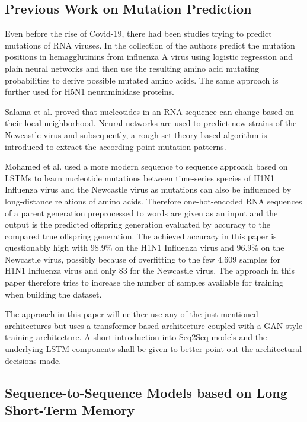 \subsection{Previous Work on Mutation Prediction} \label{fundamentalsE}

Even before the rise of Covid-19, there had been studies trying to predict mutations of \ac{RNA} viruses. In the collection of \cite{Yan2007, Wu2007, Wu2008} the authors predict the mutation positions in hemagglutinins from influenza A virus using logistic regression and plain neural networks and then use the resulting amino acid mutating probabilities to derive possible mutated amino acids. The same approach is further used for H5N1 neuraminidase proteins. 

Salama et al. \cite{Salama2016} proved that nucleotides in an \ac{RNA} sequence can change based on their local neighborhood. Neural networks are used to predict new strains of the Newcastle virus and subsequently, a rough-set theory based algorithm is introduced to extract the according point mutation patterns. 

Mohamed et al. \cite{Mohamed2021} used a more modern sequence to sequence approach based on \acp{LSTM} to learn nucleotide mutations between time-series species of H1N1 Influenza virus and the Newcastle virus as mutations can also be influenced by long-distance relations of amino acids. Therefore one-hot-encoded \ac{RNA} sequences of a parent generation preprocessed to words are given as an input and the output is the predicted offspring generation evaluated by accuracy to the compared true offspring generation. The achieved accuracy in this paper is questionably high with 98.9\% on the H1N1 Influenza virus and 96.9\% on the Newcastle virus, possibly because of overfitting to the few 4.609 samples for H1N1 Influenza virus and only 83 for the Newcastle virus. The approach in this paper therefore tries to increase the number of samples available for training when building the dataset. 

\vspace{0.5cm}
The approach in this paper will neither use any of the just mentioned architectures but uses a transformer-based architecture coupled with a \ac{GAN}-style training architecture. A short introduction into \ac{Seq2Seq} models and the underlying \ac{LSTM} components shall be given to better point out the architectural decisions made. 

\subsection{Sequence-to-Sequence Models based on Long Short-Term Memory} \label{fundamentalsF}

